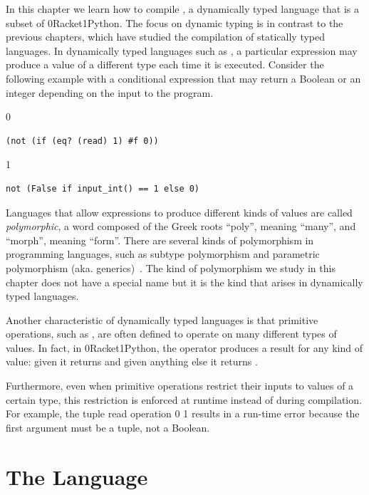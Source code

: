 \documentclass[7x10]{TimesAPriori_MIT}%
\def\racketEd{0}
\def\pythonEd{1}
\def\edition{0}
\newcommand{\racket}[1]{{\if\edition\racketEd{#1}\fi}}
\newcommand{\python}[1]{{\if\edition\pythonEd #1\fi}}
\numberwithin{theorem}{chapter}
\numberwithin{definition}{chapter}
\numberwithin{equation}{chapter}
\begin{document}
In this chapter we learn how to compile \LangDyn{}, a dynamically
typed language that is a subset of \racket{Racket}\python{Python}. The
focus on dynamic typing is in contrast to the previous chapters, which
have studied the compilation of statically typed languages. In
dynamically typed languages such as \LangDyn{}, a particular
expression may produce a value of a different type each time it is
executed. Consider the following example with a conditional 
expression that may return a Boolean or an integer depending on the
input to the program.
{\if\edition\racketEd
\begin{lstlisting}
(not (if (eq? (read) 1) #f 0))
\end{lstlisting}
\fi}
{\if\edition\pythonEd
\begin{lstlisting}
not (False if input_int() == 1 else 0)
\end{lstlisting}
\fi}

Languages that allow expressions to produce different kinds of values
are called \emph{polymorphic}, a word composed of the Greek roots
``poly'', meaning ``many'', and ``morph'', meaning ``form''.  There
are several kinds of polymorphism in programming languages, such as
subtype polymorphism and parametric polymorphism
(aka. generics)~\citep{Cardelli:1985kx}. The kind of polymorphism we
study in this chapter does not have a special name but it is the kind
that arises in dynamically typed languages.

Another characteristic of dynamically typed languages is that
primitive operations, such as , are often defined to operate
on many different types of values.  In fact, in
\racket{Racket}\python{Python}, the  operator produces a
result for any kind of value: given \FALSE{} it returns \TRUE{} and
given anything else it returns \FALSE{}.

Furthermore, even when primitive operations restrict their inputs to
values of a certain type, this restriction is enforced at runtime
instead of during compilation. For example, the tuple read
operation
\racket{}
\python{}
results in a run-time error because the first argument must
be a tuple, not a Boolean.

\section{The \LangDyn{} Language}

\newcommand{\LdynGrammarRacket}{
\begin{array}{rcl}
\Exp &::=& \LP\Exp \; \Exp\ldots\RP
      \MID \LP\key{lambda}\;\LP\Var\ldots\RP\;\Exp\RP \\
     & \MID & \LP\key{boolean?}\;\Exp\RP \MID \LP\key{integer?}\;\Exp\RP\\
     & \MID & \LP\key{vector?}\;\Exp\RP \MID \LP\key{procedure?}\;\Exp\RP \MID \LP\key{void?}\;\Exp\RP \\
  \Def &::=& \LP\key{define}\; \LP\Var \; \Var\ldots\RP \; \Exp\RP 
\end{array}
}
\end{document}
